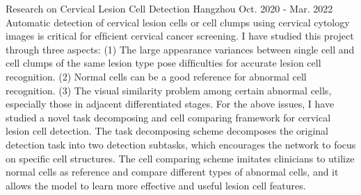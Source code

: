 
\begin{cventries}

	\cventry
	{} %
	{Research on Cervical Lesion Cell Detection} %
	{Hangzhou} %
	{Oct. 2020 - Mar. 2022} %
	{
		Automatic detection of cervical lesion cells or cell clumps using cervical cytology images is critical for efﬁcient cervical cancer screening. I have studied this project through three aspects: (1) The large appearance variances between single cell and cell clumps of the same lesion type pose difﬁculties for accurate lesion cell recognition. (2) Normal cells can be a good reference for abnormal cell recognition. (3) The visual similarity problem among certain abnormal cells, especially those in adjacent differentiated stages. For the above issues, I have studied a novel task decomposing and cell comparing framework for cervical lesion cell detection. The task decomposing scheme decomposes the original detection task into two detection subtasks, which encourages the network to focus on specific cell structures. The cell comparing scheme imitates clinicians to utilize normal cells as reference and compare different types of abnormal cells, and it allows the model to learn more effective and useful lesion cell features.
	}


\end{cventries}
